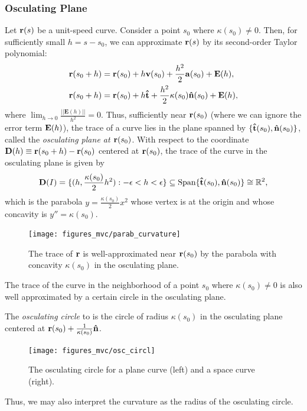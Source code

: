 \documentclass[12pt,letterpaper,reqno]{article}
\numberwithin{equation}{section}
\newcommand{\R}{\ensuremath{\mathbb R}}
\newcommand{\bv}{{\bf v}}
\newcommand{\ba}{{\bf a}}
\newcommand{\bbr}{{\bf r}}
\newcommand{\ut}{{\bf {\hat{t}}}}
\newcommand{\un}{{\bf {\hat{n}}}}
\begin{document}
{\subsubsection{Osculating Plane}
Let $\bbr(s)$ be a unit-speed curve. Consider a point $s_0$ where $\kappa(s_0) \neq 0$. Then, for sufficiently small $h=s-s_0$, we can approximate $\bbr(s)$ by its second-order Taylor polynomial:
\begin{align*}
	\bbr(s_0+h)&=\bbr(s_0)+h\bv(s_0)+\frac{h^2}{2}\ba(s_0)+\mathbf{E}(h),  \\
	\bbr(s_0+h)&=\bbr(s_0)+h\mathbf{\hat{t}}+\frac{h^2}{2}\kappa(s_0)\un(s_0)+\mathbf{E}(h),  \\
\end{align*}
where $\lim_{h \to 0}\frac{||\mathbf{E}(h)||}{h^2}=0$. Thus, sufficiently near $\bbr(s_0)$ (where we can ignore the error term ${\bf E}(h)$), the trace of a curve lies in the plane spanned by $\{\ut(s_0),\un(s_0)\}$, called the \emph{osculating plane at $\bbr(s_0)$}. With respect to the coordinate ${\bf D}(h)\equiv \bbr(s_0+h)-\bbr(s_0)$ centered at $\bbr(s_0)$, the trace of the curve in the osculating plane is given by 
\begin{align*}
	{\bf D}(I)=\{(h,\frac{\kappa(s_0)}{2}h^2):-\epsilon < h < \epsilon\} \subseteq \text{Span}\{\ut(s_0),\un(s_0)\} \cong \R^2,
\end{align*}
which is the parabola $y=\frac{\kappa(s_0)}{2}x^2$ whose vertex is at the origin and whose concavity is $y''=\kappa(s_0)$.

\begin{figure}[h]
	\begin{center}
		\texttt{[image: figures\_mvc/parab\_curvature]}
	\end{center}
	\caption{The trace of $\bbr$ is well-approximated near $\bbr(s_0)$ by the parabola with concavity $\kappa(s_0)$ in the osculating plane.}
\end{figure}

\newpage 
The trace of the curve in the neighborhood of a point $s_0$ where $\kappa(s_0) \neq 0$ is also well approximated by a certain circle in the osculating plane. 

\begin{defn}
	The \emph{osculating circle} to is the circle of radius $\kappa(s_0)$ in the osculating plane centered at $\bbr(s_0)+\frac{1}{\kappa(s_0)}\un$.
\end{defn}

\begin{figure}[h]
	\begin{center}
		\texttt{[image: figures\_mvc/osc\_circl]}
	\end{center}
	\caption{The osculating circle for a plane curve (left) and a space curve (right).}
\end{figure}
Thus, we may also interpret the curvature as the radius of the osculating circle. 

}
\end{document}
